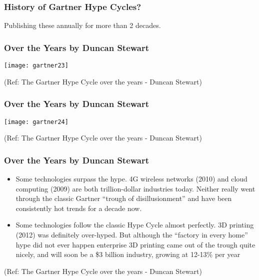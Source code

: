 \begin{frame}[fragile]\frametitle{History of Gartner Hype Cycles?}

Publishing these annually for more than 2 decades.

\end{frame}


\begin{frame}[fragile]\frametitle{Over the Years by Duncan Stewart}


\begin{center}
\texttt{[image: gartner23]}
\end{center}


{\tiny (Ref: The Gartner Hype Cycle over the years - Duncan Stewart)}

\end{frame}

\begin{frame}[fragile]\frametitle{Over the Years by Duncan Stewart}

\begin{center}
\texttt{[image: gartner24]}
\end{center}


{\tiny (Ref: The Gartner Hype Cycle over the years - Duncan Stewart)}

\end{frame}

\begin{frame}[fragile]\frametitle{Over the Years by Duncan Stewart}


\begin{itemize}
\item Some technologies surpass the hype. 4G wireless networks (2010) and cloud computing (2009) are both trillion-dollar industries today. Neither really went through the classic Gartner “trough of disillusionment” and have been consistently hot trends for a decade now.

\item Some technologies follow the classic Hype Cycle almost perfectly. 3D printing (2012) was definitely over-hyped. But although the “factory in every home” hype did not ever happen enterprise 3D printing came out of the trough quite nicely, and will soon be a \$3 billion industry, growing at 12-13\% per year

\end{itemize}

{\tiny (Ref: The Gartner Hype Cycle over the years - Duncan Stewart)}


\end{frame}

